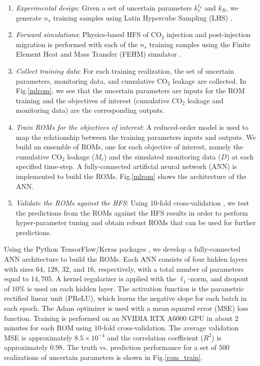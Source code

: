 \documentclass[a4paper,fleqn]{cas-sc}
\begin{document}
\begin{enumerate}[Step 1.]
\item \textit{Experimental design}: Given a set of uncertain parameters $k_{v}^{\ell_d}$ and $k_R$, we generate $n_s$ training samples using Latin Hypercube Sampling (LHS) \citep{Iman2008, Helton2003LatinSystems}.
\item \textit{Forward simulations}: Physics-based HFS of CO$_2$ injection and post-injection migration is performed with each of the $n_s$ training samples using the Finite Element Heat and Mass Transfer (FEHM) simulator \citep{Zyvoloski1997}. 
\item \textit{Collect training data}: For each training realization, the set of uncertain parameters, monitoring data, and cumulative CO$_2$ leakage are collected. In Fig.\ref{mlrom}, we see that the uncertain parameters are inputs for the ROM training and the objectives of interest (cumulative CO$_2$ leakage and monitoring data) are the corresponding outputs. 
\item \textit{Train ROMs for the objectives of interest}: A reduced-order model is used to map the relationship between the training parameters inputs and outputs. We build an ensemble of ROMs, one for each objective of interest, namely the cumulative CO$_2$ leakage ($M_c$) and the simulated monitoring data ($D$) at each specified time-step. A fully-connected artificial neural network (ANN) is implemented to build the ROMs. Fig.\ref{mlrom} shows the architecture of the ANN.
\item \textit{Validate the ROMs against the HFS}: Using 10-fold cross-validation \citep{Xu2018249}, we test the predictions from the ROMs against the HFS results in order to perform hyper-parameter tuning and obtain robust ROMs that can be used for further predictions.
\end{enumerate}

Using the Python TensorFlow/Keras packages \citep{tensorflow2015-whitepaper, chollet2015keras}, we develop a fully-connected ANN architecture to build the ROMs. Each ANN consists of four hidden layers with sizes $64$, $128$, $32$, and $16$, respectively, with a total number of parameters equal to $14,705$. A kernel regularizer is applied with the $\ell_1$-norm, and dropout of $10\%$ is used on each hidden layer. The activation function is the parametric rectified linear unit (PReLU), which learns the negative slope for each batch in each epoch. The Adam optimizer \citep{Kingma2014Adam} is used with a mean squared error (MSE) loss function. Training is performed on an NVIDIA RTX A$6000$ GPU in about $2$ minutes for each ROM using $10$-fold cross-validation. The average validation MSE is approximately $8.5\times10^{-4}$ and the correlation coefficient ($R^2$) is approximately $0.98$. The truth vs. prediction performance for a set of $500$ realizations of uncertain parameters is shown in Fig.\ref{rom_train}.
\end{document}
